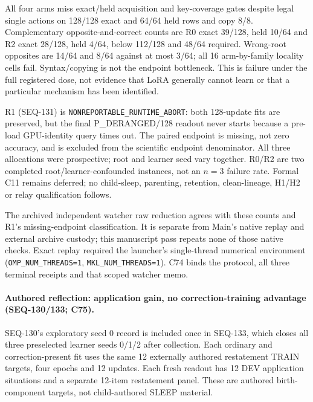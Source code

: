 \documentclass{article}
\begin{document}
All four arms miss exact/held acquisition and key-coverage gates despite legal
single actions on 128/128 exact and 64/64 held rows and copy 8/8. Complementary
opposite-and-correct counts are R0 exact 39/128, held 10/64 and R2 exact 28/128,
held 4/64, below 112/128 and 48/64 required. Wrong-root opposites are 14/64 and 8/64
against at most 3/64; all 16 arm-by-family locality cells fail. Syntax/copying is
not the endpoint bottleneck. This is failure under the full registered dose,
not evidence that LoRA generally cannot learn or that a particular mechanism
has been identified.

R1 (SEQ-131) is \texttt{NONREPORTABLE\_RUNTIME\_ABORT}: both 128-update fits
are preserved, but the final P\_DERANGED/128 readout never starts because a
pre-load GPU-identity query times out. The paired endpoint is missing, not zero
accuracy, and is excluded from the scientific endpoint denominator. All three
allocations were prospective; root and learner seed vary together. R0/R2 are
two completed root/learner-confounded instances, not an $n=3$ failure rate.
Formal C11 remains deferred; no child-sleep, parenting, retention, clean-lineage,
H1/H2 or relay qualification follows.

The archived independent watcher raw reduction agrees with these counts and
R1's missing-endpoint classification. It is separate from Main's native replay
and external archive custody; this manuscript pass repeats none of those native
checks. Exact replay required the launcher's single-thread numerical environment
(\texttt{OMP\_NUM\_THREADS=1}, \texttt{MKL\_NUM\_THREADS=1}). C74 binds the
protocol, all three terminal receipts and that scoped watcher memo.

\paragraph{Authored reflection: application gain, no correction-training advantage (SEQ-130/133; C75).}
SEQ-130's exploratory seed 0 record is included once in SEQ-133, which closes
all three preselected learner seeds 0/1/2 after collection. Each ordinary and
correction-present fit uses the same 12 externally authored restatement TRAIN
targets, four epochs and 12 updates. Each fresh readout has 12 DEV application
situations and a separate 12-item restatement panel. These are authored
birth-component targets, not child-authored SLEEP material.
\end{document}
